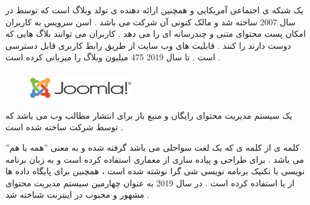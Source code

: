 \documentclass[12pt]{book}
\begin{document}
یک شبکه ی اجتماعی آمریکایی و همچنین ارائه دهنده ی  تولد وبلاگ است که توسط
در سال 2007 ساخته شد و مالک کنونی آن شرکت
می باشد .
اسن سرویس به کاربران امکان پست محتوای  متنی و چندرسانه ای  را می دهد .
کاربران می توانند بلاگ هایی که دوست دارند را 
کنند .
قابلیت های وب سایت از طریق رابط کاربری
قابل دسترسی است .
تا سال 2019
475 میلیون وبلاگ را میزبانی کرده است .


\newpage

\subsubsection{}

\begin{figure}
  \vspace{40pt}
  \begin{center}
    \includegraphics[width=0.4\textwidth]{./640px-Joomla!-Logo.svg.png}
  \end{center}
  \vspace{-20pt}
  \caption{}
  \vspace{-10pt}
\end{figure}




یک سیستم مدیریت محتوای رایگان و منبع باز 
برای انتشار مطالب وب می باشد که توسط شرکت
ساخته شده است .

کلمه ی 
از کلمه ی 
که یک لغت سواحلی می باشد گرفته شده و به معنی ''همه با هم'' می باشد .
برای طراحی و پیاده سازی از معماری 
استفاده کرده است و به زبان برنامه نویسی 
با تکنیک برنامه نویسی شی گرا 
نوشته شده است ، همچنین برای پایگاه داده ها از
یا
 استفاده کرده است .
 در سال 2019
به عنوان چهارمین سیستم مدیریت محتوای
مشهور و محبوب در اینترنت شناخته شد .


\subsubsection{}
\end{document}
